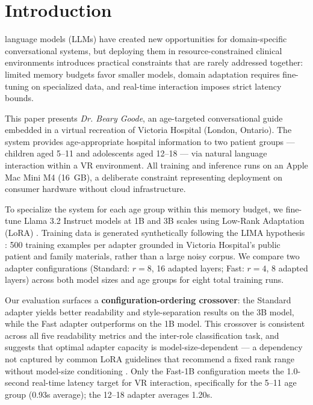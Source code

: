 \documentclass[journal]{IEEEtai}
\begin{document}
\begin{abstract}
both adapter rank and layer depth jointly determine optimal configuration, with architecture depth predicting the rank regime.
\end{abstract}

\section{Introduction}

 language models (LLMs) have created new opportunities for domain-specific conversational systems, but deploying them in resource-constrained clinical environments introduces practical constraints that are rarely addressed together: limited memory budgets favor smaller models, domain adaptation requires fine-tuning on specialized data, and real-time interaction imposes strict latency bounds.

This paper presents \textit{Dr. Beary Goode}, an age-targeted conversational guide embedded in a virtual recreation of Victoria Hospital (London, Ontario). The system provides age-appropriate hospital information to two patient groups --- children aged 5--11 and adolescents aged 12--18 --- via natural language interaction within a VR environment. All training and inference runs on an Apple Mac Mini M4 (16~GB), a deliberate constraint representing deployment on consumer hardware without cloud infrastructure.

To specialize the system for each age group within this memory budget, we fine-tune Llama 3.2 Instruct models \cite{dubey2024llama3} at 1B and 3B scales using Low-Rank Adaptation (LoRA) \cite{hu2022lora}. Training data is generated synthetically following the LIMA hypothesis \cite{zhou2023lima}: 500 training examples per adapter grounded in Victoria Hospital's public patient and family materials, rather than a large noisy corpus. We compare two adapter configurations (Standard: $r = 8$, 16 adapted layers; Fast: $r = 4$, 8 adapted layers) across both model sizes and age groups for eight total training runs.

Our evaluation surfaces a \textbf{configuration-ordering crossover}: the Standard adapter yields better readability and style-separation results on the 3B model, while the Fast adapter outperforms on the 1B model. This crossover is consistent across all five readability metrics and the inter-role classification task, and suggests that optimal adapter capacity is model-size-dependent --- a dependency not captured by common LoRA guidelines that recommend a fixed rank range without model-size conditioning \cite{biderman2024lora}. Only the Fast-1B configuration meets the 1.0-second real-time latency target for VR interaction, specifically for the 5--11 age group (0.93s average); the 12--18 adapter averages 1.20s.
\end{document}

